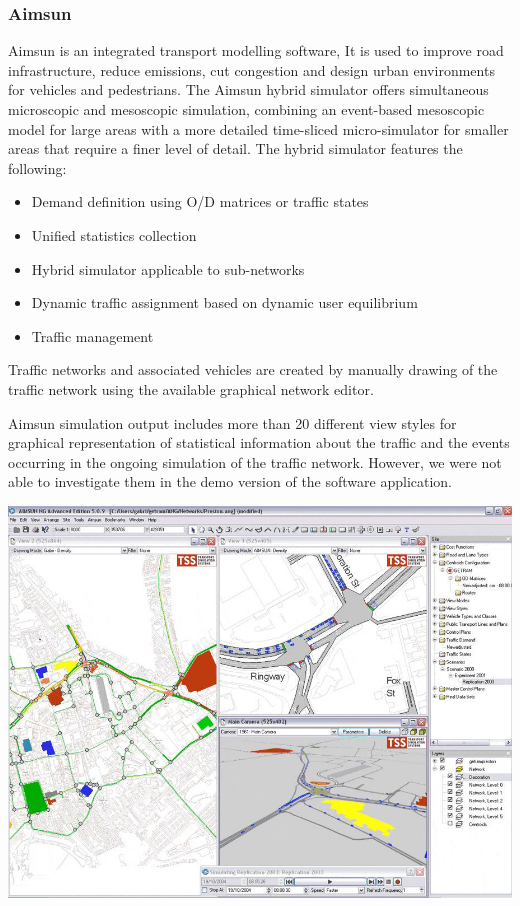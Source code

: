 \subsubsection{Aimsun}
	Aimsun is an integrated transport modelling software, It is used to improve road infrastructure, reduce emissions, cut congestion and design urban environments for vehicles and pedestrians. The Aimsun hybrid simulator offers simultaneous microscopic and mesoscopic simulation, combining an event-based mesoscopic model for large areas with a more detailed time-sliced micro-simulator for smaller areas that require a finer level of detail\cite{EM2}. The hybrid simulator features the following:
	\begin{itemize}
		\item Demand definition using O/D matrices or traffic states
		\item Unified statistics collection
		\item Hybrid simulator applicable to sub-networks
		\item Dynamic traffic assignment based on dynamic user equilibrium
		\item Traffic management
	\end{itemize}
	
	Traffic networks and associated vehicles are created by manually drawing of the traffic network using the available graphical network editor.
	
	Aimsun simulation output includes more than 20 different view styles for graphical representation of statistical information about the traffic and the events occurring in the ongoing simulation of the traffic network. However, we were not able to investigate them in the demo version of the software application.
	
	\begin{center}
	\includegraphics[scale=0.3]{./images/Aimsun.png}
	\end{center}
	
